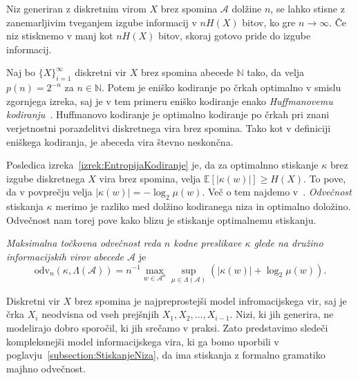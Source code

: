 \documentclass[fin1, tisk]{fmfdelo}
\providecommand{\abs}[1]{\left\lvert #1 \right\rvert}
\newcommand{\N}{\mathbb{N}}
\newcommand{\E}{\mathbb{E}}
\newcommand{\A}{\mathcal{A}}
\theoremstyle{definition}
\begin{document}
\begin{izrek}\label{izrek:EntropijaKodiranje}
    Niz generiran z diskretnim virom $X$ brez spomina $\A$ dolžine $n$, se lahko stisne z 
    zanemarljivim tveganjem izgube informacij v $n H(X)$ bitov, ko gre $n \to \infty$. 
    Če niz stisknemo v manj kot $n H(X)$ bitov, skoraj gotovo pride do izgube informacij.
\end{izrek}

\begin{primer}
    Naj bo $\{ X \}_{i=1}^{\infty}$ diskretni vir $X$ brez spomina abecede $\N$ tako, da velja 
    $p(n) = 2^{-n}$ za $n \in \N$. Potem je eniško kodiranje po črkah optimalno v smislu zgornjega
    izreka, saj je v tem primeru eniško kodiranje enako \emph{Huffmanovemu kodiranju}~\cite{Huffman1952}.
    Huffmanovo kodiranje je optimalno kodiranje po črkah pri znani verjetnostni porazdelitvi 
    diskretnega vira brez spomina. Tako kot v definiciji eniškega kodiranja, je abeceda vira 
    števno neskončna.
\end{primer}

Posledica izreka~\ref{izrek:EntropijaKodiranje} je, da za optimalnno stiskanje $\kappa$ brez 
izgube diskretnega $X$ vira brez spomina, velja $\E[\abs{\kappa(w)}] \geq H(X)$.
To pove, da v povprečju velja $\abs{\kappa(w)} = - \log_2\mu(w)$. Več o tem najdemo 
v~\cite[1. poglavje, 5. razdelek]{Mackay2003}. \emph{Odvečnost} stiskanja $\kappa$ merimo
je razliko med dolžino kodiranega niza in optimalno doložino. Odvečnost nam torej pove kako
blizu je stiskanje optimalnemu stiskanju.

\begin{definicija}\label{def:odv}
    \emph{Maksimalna točkovna odvečnost reda $n$ kodne preslikave $\kappa$ glede na družino 
    informacijskih virov abecede $\A$} je
    \[
        \text{odv}_{n} \left( \kappa, \Lambda(\A) \right) = n^{-1} \max_{w \in \A^n} \sup_{\mu \in \Lambda(\A)}
        \left( \abs{\kappa(w)} + \log_2 \mu(w) \right).
    \]
\end{definicija}

Diskretni vir $X$ brez spomina je najpreprostejši model infromacijskega vir, saj je črka $X_i$ 
neodvisna od vseh prejšnjih $X_1, X_2, \ldots , X_{i-1}$. Nizi, ki jih generira, ne modelirajo
dobro sporočil, ki jih srečamo v praksi. Zato predstavimo sledeči kompleksnejši model
informacijskega vira, ki ga bomo uporbili v poglavju~\ref{subsection:StiskanjeNiza}, da ima
stiskanja z formalno gramatiko majhno odvečnost.
\end{document}
